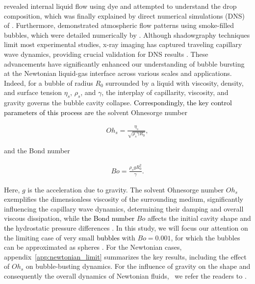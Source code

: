 \documentclass{jfm}
\newcommand{\DL}[1]{{\textcolor{black}{#1}}}
\newcommand{\oo}{\color{magenta} \normalfont}
\newcommand{\bb}{\color{black} \normalfont}
\begin{document}
\citet{macintyre1972flow} revealed internal liquid flow using dye and attempted to understand the drop composition, which was finally explained by direct numerical simulations (DNS) of \citet{dubitsky2023enrichment}.
Furthermore, \citet{dasouqi2022effect} demonstrated atmospheric flow patterns using smoke-filled bubbles, which were detailed numerically by \citet{singh2021dynamics}.
Although shadowgraphy techniques limit most experimental studies, x-ray imaging has captured traveling capillary wave dynamics, providing crucial validation for DNS results \citep{lee2011size}. These advancements have significantly enhanced our understanding of bubble bursting at the Newtonian liquid-gas interface across various scales and applications.
Indeed, for a bubble of radius $R_0$ surrounded by a liquid with viscosity, density, and surface tension $\eta_s$, $\rho_s$, and $\gamma$, the interplay of capillarity, viscosity, and gravity governs the bubble cavity collapse. \DL{Correspondingly, the key control parameters of this process are} the solvent Ohnesorge number

\begin{align}
	\label{eq:Ohdef}
	Oh_s = \frac{\eta_s}{\sqrt{\rho_s\gamma R_0}},
\end{align}

\noindent and the Bond number

\begin{align}
	\label{eq:Bodef}
	Bo = \frac{\rho_sgR_0^2}{\gamma}.
\end{align}

\noindent Here, $g$ is the acceleration due to gravity. The solvent Ohnesorge number $Oh_s$ exemplifies the dimensionless viscosity of the surrounding medium, significantly influencing the capillary wave dynamics, determining their damping and overall viscous dissipation, while \DL{the Bond number} $Bo$ affects the initial cavity shape and \DL{the} hydrostatic pressure differences \citep{walls2015jet,bergmann2006giant,bergmann2009controlled,Lohse2018}. In this study, we will focus our attention on the limiting case of very small \DL{bubbles} with $Bo = 0.001$, for which the bubbles can be approximated as spheres \citep[figures~\ref{schematic}a,][]{toba1959drop,princen1963shape,lhuissier2012bursting}.
For the Newtonian cases, appendix~\ref{app:newtonian_limit} summarizes the key results, including the effect of $Oh_s$ on bubble-busting dynamics. For the influence of gravity on the shape and consequently the overall dynamics of \oo Newtonian fluids,\bb\, we refer the readers to \citet{toba1959drop,princen1963shape,walls2015jet,krishnan2017scaling,deike2018dynamics}.
\end{document}
